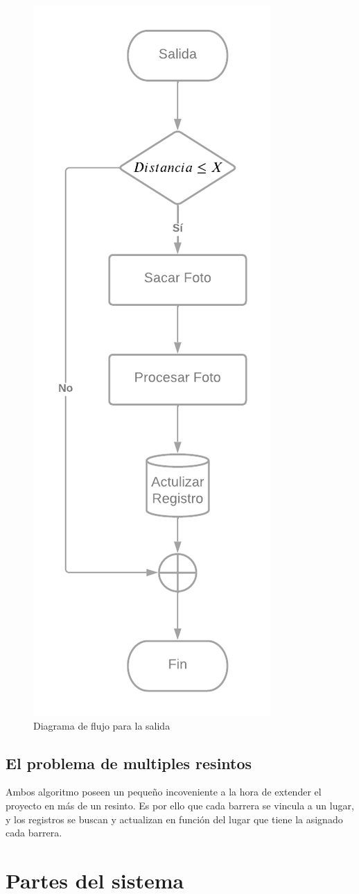 \begin{figure}
    \centering
    \includegraphics[width=.5\textwidth]{imgs/flujo-salida.png}
    \caption{Diagrama de flujo para la salida}
    \label{fig:flujo-salida}
\end{figure}

\subsection{El problema de multiples resintos}

Ambos algoritmo poseen un pequeño incoveniente a la hora de extender el proyecto en más de un resinto. Es por ello que cada barrera se vincula a un lugar, y los registros se buscan y actualizan en función del lugar que tiene la asignado cada barrera.
\section{Partes del sistema}

